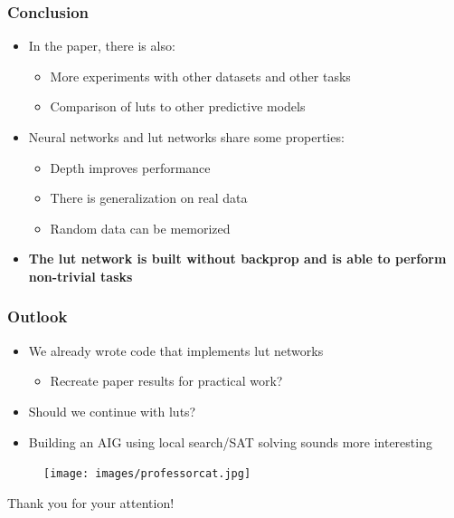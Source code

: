 \documentclass[pdflatex,compress]{beamer}
\begin{document}
\begin{frame}
	\frametitle{Conclusion}
	\begin{itemize}[<+->]
	\item In the paper, there is also:
		\begin{itemize}
			\item More experiments with other datasets and other tasks
			\item Comparison of luts to other predictive models
		\end{itemize}
		\vspace{1em}
	\item Neural networks and lut networks share some properties:
		\begin{itemize}
			\item Depth improves performance
			\item There is generalization on real data
			\item Random data can be memorized
		\end{itemize}
		\vspace{1em}
	\item \textbf{The lut network is built without backprop and is able to perform non-trivial tasks}
\end{itemize}
\end{frame}

\begin{frame}
	\frametitle{Outlook}
	\begin{itemize}[<+->]
		\item We already wrote code that implements lut networks
			\begin{itemize}
				\item Recreate paper results for practical work?
			\end{itemize}
			\vspace{1em}
		\item Should we continue with luts?
			\vspace{1em}
		\item Building an AIG using local search/SAT solving sounds more interesting
	\end{itemize}
\end{frame}

\begin{frame}
\begin{figure}
\centering
\texttt{[image: images/professorcat.jpg]}
\end{figure}
\begin{center}
\huge Thank you for your attention!
\end{center}
\end{frame}
\end{document}
